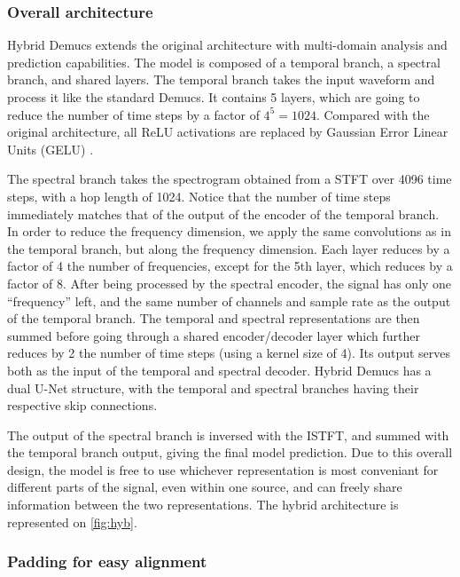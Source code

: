 \documentclass[10pt,a4paper,onecolumn]{article}
\begin{document}
\hypertarget{overall-architecture}{%
\subsubsection{Overall architecture}\label{overall-architecture}}

Hybrid Demucs extends the original architecture with multi-domain
analysis and prediction capabilities. The model is composed of a
temporal branch, a spectral branch, and shared layers. The temporal
branch takes the input waveform and process it like the standard Demucs.
It contains 5 layers, which are going to reduce the number of time steps
by a factor of \(4^5 = 1024\). Compared with the original architecture,
all ReLU activations are replaced by Gaussian Error Linear Units (GELU)
\citep{gelu}.

The spectral branch takes the spectrogram obtained from a STFT over 4096
time steps, with a hop length of 1024. Notice that the number of time
steps immediately matches that of the output of the encoder of the
temporal branch. In order to reduce the frequency dimension, we apply
the same convolutions as in the temporal branch, but along the frequency
dimension. Each layer reduces by a factor of 4 the number of
frequencies, except for the 5th layer, which reduces by a factor of 8.
After being processed by the spectral encoder, the signal has only one
``frequency'' left, and the same number of channels and sample rate as
the output of the temporal branch. The temporal and spectral
representations are then summed before going through a shared
encoder/decoder layer which further reduces by 2 the number of time
steps (using a kernel size of 4). Its output serves both as the input of
the temporal and spectral decoder. Hybrid Demucs has a dual U-Net
structure, with the temporal and spectral branches having their
respective skip connections.

The output of the spectral branch is inversed with the ISTFT, and summed
with the temporal branch output, giving the final model prediction. Due
to this overall design, the model is free to use whichever
representation is most conveniant for different parts of the signal,
even within one source, and can freely share information between the two
representations. The hybrid architecture is represented on
\ref{fig:hyb}.

\hypertarget{padding-for-easy-alignment}{%
\subsubsection{Padding for easy
alignment}\label{padding-for-easy-alignment}}
\end{document}
